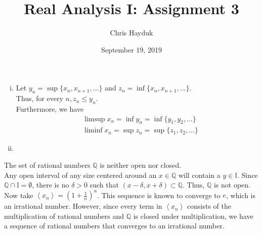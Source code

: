 \documentclass[12pt]{article}
\newenvironment{problem}[2][Problem]{\begin{trivlist}
\item[\hskip \labelsep {\bfseries #1}\hskip \labelsep {\bfseries #2.}]}{\end{trivlist}}
\begin{document}
\title{Real Analysis I: Assignment 3}

\author{Chris Hayduk}
\date{September 19, 2019}

\maketitle

\begin{problem}{1}
\end{problem}

\begin{problem}{2}
\end{problem}

\begin{enumerate}[i)]
	\item Let $y_n = \sup\{x_n, x_{n+1}, ...\}$ and $z_n = \inf\{x_n, x_{n+1}, ...\}$.\\
	
	Thus, for every $n, z_n \leq y_n$.\\
	
	Furthermore, we have
	\begin{align*}
		&\limsup{x_n} = \inf{y_n} = \inf{\{y_1, y_2, ...\}}\\
		&\liminf{x_n} = \sup{z_n} = \sup{\{z_1, z_2, ...\}}
	\end{align*}
	
	\item 
\end{enumerate}

\begin{problem}{3}
\end{problem}

The set of rational numbers $\mathbb{Q}$ is neither open nor closed.\\

Any open interval of any size centered around an $x \in \mathbb{Q}$ will contain a $y \in \mathbb{I}$. Since $\mathbb{Q} \cap \mathbb{I} = \emptyset$, there is no $\delta > 0$ such that $(x - \delta, x + \delta) \subset \mathbb{Q}$. Thus, $\mathbb{Q}$ is not open.\\

Now take $\left<x_n\right> = (1 + \frac{1}{n})^n$. This sequence is known to converge to $e$, which is an irrational number. However, since every term in $\left<x_n\right>$ consists of the multiplication of rational numbers and $\mathbb{Q}$ is closed under multiplication, we have a sequence of rational numbers that converges to an irrational number.\\
\end{document}
